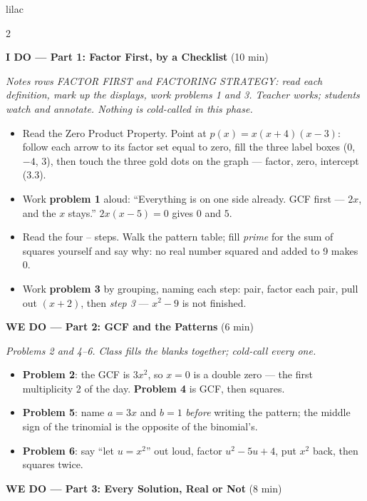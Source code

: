 \documentclass[10pt]{article}
\begin{document}
\begin{skillbox}{lilac}
\begin{multicols}{2}

\textbf{I DO --- Part 1: Factor First, by a Checklist} (10 min)

\textit{Notes rows FACTOR FIRST and FACTORING STRATEGY: read each definition, mark up the
displays, work problems 1 and 3. Teacher works; students watch and annotate. Nothing is
cold-called in this phase.}
\begin{itemize}
  \item Read the Zero Product Property. Point at $p(x) = x(x + 4)(x - 3)$: follow each arrow
        to its factor set equal to zero, fill the three label boxes ($0$, $-4$, $3$), then
        touch the three gold dots on the graph --- factor, zero, intercept (3.3).
  \item Work \textbf{problem 1} aloud: ``Everything is on one side already. GCF first ---
        $2x$, and the $x$ stays.'' $2x(x - 5) = 0$ gives $0$ and $5$.
  \item Read the four -- steps. Walk the pattern table; fill
        \textit{prime} for the sum of squares yourself and say why: no real number squared
        and added to 9 makes 0.
  \item Work \textbf{problem 3} by grouping, naming each step: pair, factor each pair, pull
        out $(x + 2)$, then \emph{step 3} --- $x^2 - 9$ is not finished.
\end{itemize}

\textbf{WE DO --- Part 2: GCF and the Patterns} (6 min)

\textit{Problems 2 and 4--6. Class fills the blanks together; cold-call every one.}
\begin{itemize}
  \item \textbf{Problem 2}: the GCF is $3x^2$, so $x = 0$ is a double zero --- the first
        multiplicity 2 of the day. \textbf{Problem 4} is GCF, then squares.
  \item \textbf{Problem 5}: name $a = 3x$ and $b = 1$ \emph{before} writing the pattern; the
        middle sign of the trinomial is the opposite of the binomial's.
  \item \textbf{Problem 6}: say ``let $u = x^2$'' out loud, factor $u^2 - 5u + 4$, put $x^2$
        back, then squares twice.
\end{itemize}

\columnbreak

\textbf{WE DO --- Part 3: Every Solution, Real or Not} (8 min)


\end{multicols}
\end{skillbox}
\end{document}
